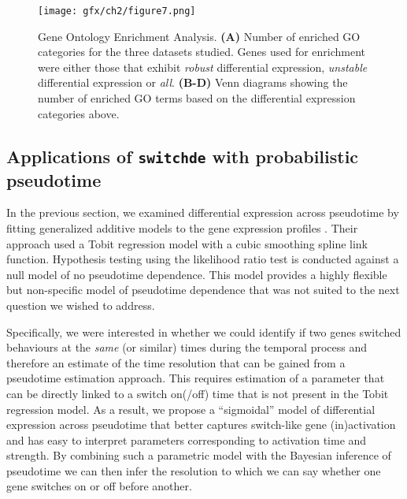 \begin{figure}
\centering
	\texttt{[image: gfx/ch2/figure7.png]}
\caption{ Gene Ontology Enrichment Analysis.
\textbf{(A)} Number of enriched GO categories for the three datasets studied. Genes used for enrichment were either those that exhibit \emph{robust} differential expression, \emph{unstable} differential expression or \emph{all}.
\textbf{(B-D)} Venn diagrams showing the number of enriched GO terms based on the differential expression categories above.} \label{fig:go_enrichment}
\end{figure}


\subsection{Applications of \texttt{switchde} with probabilistic pseudotime}

In the previous section, we examined differential expression across pseudotime by fitting generalized additive models to the gene expression profiles \cite{Trapnell2014-xi}. Their approach used a Tobit regression model with a cubic smoothing spline link function. Hypothesis testing using the likelihood ratio test is conducted against a null model of no pseudotime dependence. This model provides a highly flexible but non-specific model of pseudotime dependence that was not suited to the next question we wished to address.

Specifically, we were interested in whether we could identify if two genes switched behaviours at the \emph{same} (or similar) times during the temporal process and therefore an estimate of the time resolution that can be gained from a pseudotime estimation approach. This requires estimation of a parameter that can be directly linked to a switch on(/off) time that is not present in the Tobit regression model. As a result, we propose a ``sigmoidal'' model of differential expression across pseudotime that better captures switch-like gene (in)activation and has easy to interpret parameters corresponding to activation time and strength. By combining such a parametric model with the Bayesian inference of pseudotime we can then infer the resolution to which we can say whether one gene switches on or off before another.

